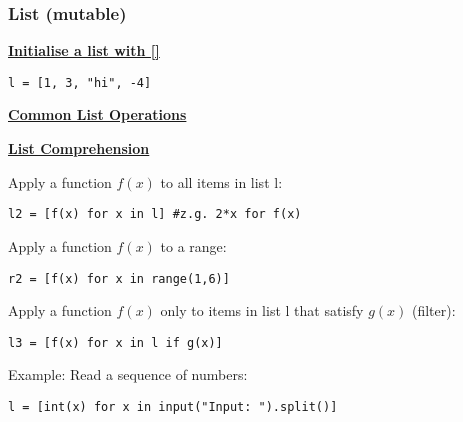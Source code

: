 \subsubsection{List (mutable)}
{\centering\underline{\textbf{Initialise a list with []}} \par}
\begin{lstlisting}
l = [1, 3, "hi", -4]
\end{lstlisting}

{\centering\underline{\textbf{Common List Operations}} \par}


{\centering\underline{\textbf{List Comprehension}} \par}
Apply a function $f(x)$ to all items in list l:
\begin{lstlisting}
l2 = [f(x) for x in l] #z.g. 2*x for f(x)
\end{lstlisting}
Apply a function $f(x)$ to a range:
\begin{lstlisting}
r2 = [f(x) for x in range(1,6)]
\end{lstlisting}
Apply a function $f(x)$ only to items in list l that satisfy $g(x)$ (filter):
\begin{lstlisting}
l3 = [f(x) for x in l if g(x)]
\end{lstlisting}
Example: Read a sequence of numbers:
\begin{lstlisting}
l = [int(x) for x in input("Input: ").split()]
\end{lstlisting}